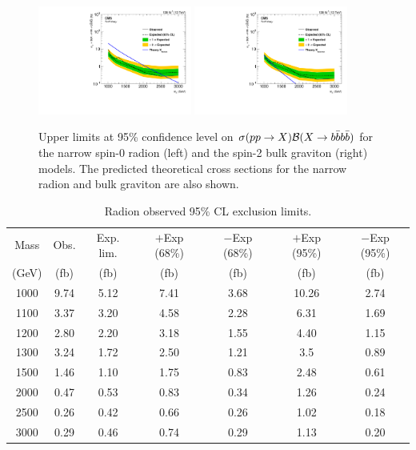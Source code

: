 \begin{figure}[!htb]
	\centering
	\includegraphics[width=0.45\textwidth]{Figures/limits_combine_137fb_dak8MDHbb_signalsAll_RadNar_2x2.pdf}
        \includegraphics[width=0.45\textwidth]{Figures/limits_combine_137fb_dak8MDHbb_signalsAll_GravNar_2x2.pdf}
        \caption{Upper limits at 95\% confidence level on
        $\sigma(pp\to X) \mathcal{B}(X\to b \bar{b}b \bar{b})$
        for the narrow spin-0 radion (left) and
        the spin-2 bulk graviton (right) models.  The predicted theoretical
        cross sections for the narrow radion and bulk graviton are also
        shown.}
	\label{fig:RadionLimitFULL}
 	\label{fig:GravitonLimitFULL}
\end{figure}

\begin{table}[h]
	\begin{center}
	\caption{Radion observed 95\% CL exclusion limits.}
	\label{tab:ExpLimRad}
	\begin{tabular}{c c c c c c c } 
	 \hline
	   Mass& Obs. & Exp. lim.& $+$Exp (68\%)& $-$Exp (68\%)& $+$Exp (95\%)& $-$Exp (95\%)\\
	   (GeV) & (fb) & (fb) & (fb) & (fb)& (fb)& (fb) \\
	\hline
	 1000 & 9.74 & 5.12 & 7.41 & 3.68 & 10.26 & 2.74 \\
	 1100 & 3.37 & 3.20 & 4.58 & 2.28 & 6.31 & 1.69 \\
	 1200 & 2.80 & 2.20 & 3.18 & 1.55 & 4.40 & 1.15 \\
	 1300 & 3.24 & 1.72 & 2.50 & 1.21 & 3.5 & 0.89 \\
	 1500 & 1.46 & 1.10 & 1.75 & 0.83 & 2.48 & 0.61 \\
	 2000 & 0.47 & 0.53 & 0.83 & 0.34 & 1.26 & 0.24 \\
	 2500 & 0.26 & 0.42 & 0.66 & 0.26 & 1.02 & 0.18 \\
	 3000 & 0.29 & 0.46 & 0.74 & 0.29 & 1.13 & 0.20 \\ 
	 \hline
	\end{tabular}
	\end{center}
	\end{table}
	
